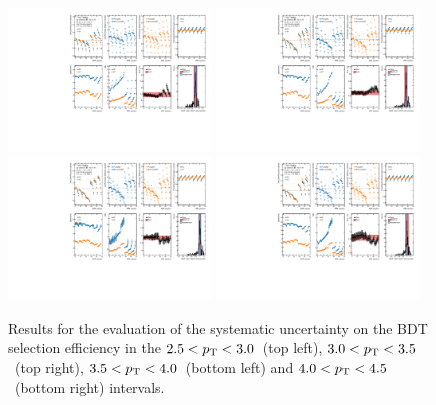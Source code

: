 \begin{figure}
    \centering
    \includegraphics[width=0.48\textwidth]{Figures/Chapter 6/AllSystBDT/BDTsyst4.pdf}
    \includegraphics[width=0.48\textwidth]{Figures/Chapter 6/AllSystBDT/BDTsyst5.pdf}
    \includegraphics[width=0.48\textwidth]{Figures/Chapter 6/AllSystBDT/BDTsyst6.pdf}
    \includegraphics[width=0.48\textwidth]{Figures/Chapter 6/AllSystBDT/BDTsyst7.pdf}
    \caption{Results for the evaluation of the systematic uncertainty on the BDT selection efficiency in the $2.5 < p_\mathrm{T} < 3.0$~\gevc (top left), $3.0 < p_\mathrm{T} < 3.5$~\gevc (top right), $3.5 < p_\mathrm{T} < 4.0$~\gevc (bottom left) and $4.0 < p_\mathrm{T} < 4.5$~\gevc (bottom right) intervals.}
\end{figure}

